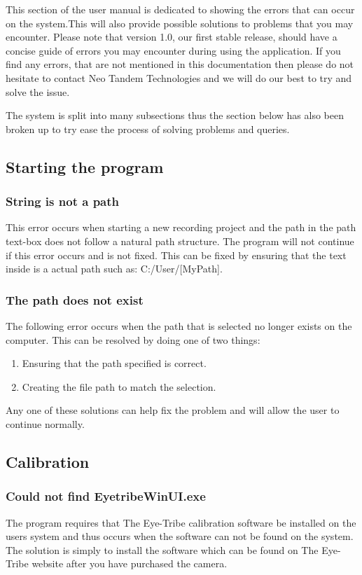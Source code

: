 This section of the user manual is dedicated to showing the errors that can occur on the system.This will also provide possible solutions to problems that you may encounter. Please note that version 1.0, our first stable release, should have a concise guide of errors you may encounter during using the application. If you find any errors, that are not mentioned in this documentation then please do not hesitate to contact Neo Tandem Technologies and we will do our best to try and solve the issue.

The system is split into many subsections thus the section below has also been broken up to try ease the process of solving problems and queries.

\subsection{Starting the program}
\subsubsection{String is not a path}
This error occurs when starting a new recording project and the path in the path text-box does not follow a natural path structure. The program will not continue if this error occurs and is not fixed.
This can be fixed by ensuring that the text inside is a actual path such as: C:/User/[MyPath].

\subsubsection{The path does not exist}
The following error occurs when the path that is selected no longer exists on the computer. This can be resolved by doing one of two things:
\begin{enumerate}
\item Ensuring that the path specified is correct.
\item Creating the file path to match the selection. 
\end{enumerate}
Any one of these solutions can help fix the problem and will allow the user to continue normally.

\subsection{Calibration}
\subsubsection{Could not find EyetribeWinUI.exe}
The program requires that The Eye-Tribe calibration software be installed on the users system and thus occurs when the software can not be found on the system. The solution is simply to install the software which can be found on The Eye-Tribe website after you have purchased the camera.

